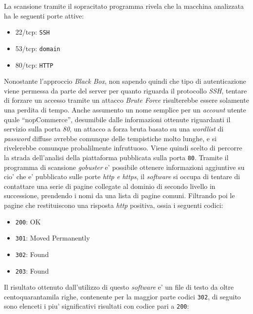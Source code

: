 \documentclass[a4paper]{report}
\newcommand{\quotes}[1]{``#1''}
\begin{document}
			La scansione tramite il sopracitato programma rivela che la macchina analizzata ha le seguenti porte attive:
			\begin{itemize}
				\item 22/tcp: \texttt{SSH}
				\item 53/tcp: \texttt{domain}
				\item 80/tcp: \texttt{HTTP}
			\end{itemize}
			Nonostante l'approccio \emph{Black Box}, non sapendo quindi che tipo di autenticazione viene permessa da
			parte del server per quanto riguarda il protocollo \emph{SSH}, tentare di forzare un accesso tramite un
			attacco \emph{Brute Force} risulterebbe essere solamente una perdita di tempo. Anche assumento un nome
			semplice per un \emph{account} utente quale \quotes{nopCommerce}, desumibile dalle informazioni ottenute
			riguardanti il servizio sulla porta \emph{80}, un attacco a forza bruta basato su una \emph{wordlist} di
			\emph{password} diffuse avrebbe comunque delle tempistiche molto lunghe, e si rivelerebbe comunque
			probalilmente infruttuoso.  Viene quindi scelto di percorre la strada dell'analisi della piattaforma
			pubblicata sulla porta \texttt{80}.  Tramite il programma di scansione \emph{gobuster}\label{gobuster} e'
			possibile ottenere informazioni aggiuntive su cio' che e' pubblicato sulle porte \emph{http e https}, il
			\emph{software} si occupa di tentare di contattare una serie di pagine collegate al dominio di secondo
			livello in successione, prendendo i nomi da una lista di pagine comuni. Filtrando poi le pagine che
			restituiscono una risposta \emph{http} positiva, ossia i seguenti codici:
			\begin{itemize}
				\item \texttt{200}: OK
				\item \texttt{301}: Moved Permanently
				\item \texttt{302}: Found
				\item \texttt{203}: Found
			\end{itemize}
			Il risultato ottenuto dall'utilizzo di questo \emph{software} e' un file di testo da oltre centoquarantamila
			righe, contenente per la maggior parte codici \texttt{302}, di seguito sono elenceti i piu' significativi
			risultati con codice pari a \texttt{200}:
\end{document}
